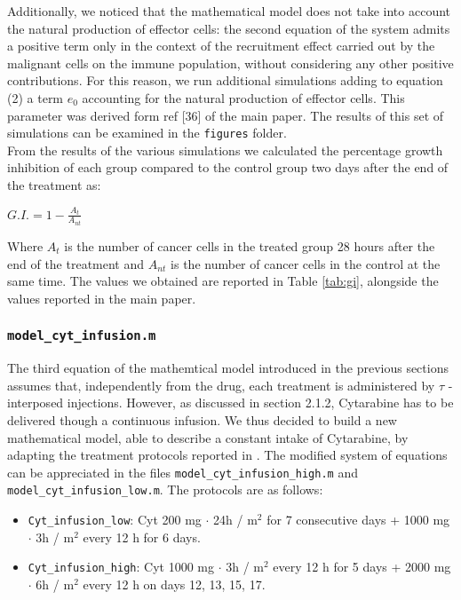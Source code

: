 Additionally, we noticed that the mathematical model does not take into account the natural production of effector cells: the second equation of the system admits a positive term only in the context of the recruitment effect carried out by the malignant cells on the immune population, without considering any other positive contributions. For this reason, we run additional simulations adding to equation (2) a term $e_0$ accounting for the natural production of effector cells. This parameter was derived form ref [36] of the main paper. The results of this set of simulations can be examined in the \texttt{figures} folder. \\
From the results of the various simulations we calculated the percentage growth inhibition of each group compared to the control group two days after the end of the treatment as:

$G.I. = 1 - \frac{A_t}{A_{nt}}$ 

Where $A_t$ is the number of cancer cells in the treated group 28 hours after the end of the treatment and $A_{nt}$ is the number of cancer cells in the control at the same time. The values we obtained are reported in Table \ref{tab:gi}, alongside the values reported in the main paper.

\subsubsection{\texttt{model\_cyt\_infusion.m}}
The third equation of the mathemtical model introduced in the previous sections assumes that, independently from the drug, each treatment is administered by $\tau$ - interposed injections. However, as discussed in section 2.1.2, Cytarabine has to be delivered though a continuous infusion. 
We thus decided to build a new mathematical model, able to describe a constant intake of Cytarabine, by adapting the treatment protocols reported in \cite{cyt-3}. The modified system of equations can be appreciated in the files \texttt{model\_cyt\_infusion\_high.m} and \texttt{model\_cyt\_infusion\_low.m}. The protocols are as follows:

\begin{itemize}
	\item \texttt{Cyt\_infusion\_low}: Cyt 200 mg $\cdot$ 24h / m$^2$ for 7 consecutive days + 1000 mg $\cdot$ 3h / m$^2$ every 12 h for 6 days.
	\item \texttt{Cyt\_infusion\_high}: Cyt 1000 mg $\cdot$ 3h / m$^2$ every 12 h for 5 days + 2000 mg $\cdot$ 6h / m$^2$ every 12 h on days 12, 13, 15, 17.
\end{itemize}

